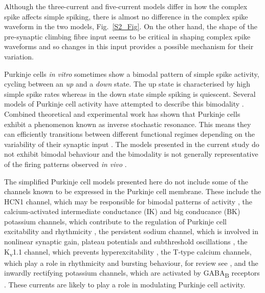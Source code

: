 \documentclass[twocolumn]{svjour3}          %
\begin{document}
Although the three-current and five-current models differ in how the
complex spike affects simple spiking, there is almost no difference in
the complex spike waveform in the two models, Fig.~\ref{S2_Fig}. On
the other hand, the shape of the pre-synaptic climbing fibre input
seems to be critical in shaping complex spike waveforms and so changes
in this input provides a possible mechanism for their variation.

Purkinje cells \textsl{in vitro} sometimes show a bimodal pattern of
simple spike activity, cycling between an \textsl{up} and a
\textsl{down} state. The up state is characterised by high simple
spike rates whereas in the down state simple spiking is
quiescent. Several models of Purkinje cell activity have attempted to
describe this bimodality
\citep{Forrest2014,ForrestEtAl2012,LlinasSugimori1980b,LoewensteinEtAl2005,McKayEtAl2007,WilliamsEtAl2002}. Combined theoretical and experimental work has shown that Purkinje cells exhibit a phenomenon known as inverse stochastic resonance. This means they can efficiently transitions between different functional regimes depending on the variability of their synaptic input \citep{buchin2016inverse}. The
models presented in the current study do not exhibit bimodal behaviour and the
bimodality is not generally representative of the firing patterns
observed \textsl{in vivo}
\citep{CerminaraRawson2004,McKayEtAl2007,SchonewilleEtAl2006}.

The simplified Purkinje cell models presented here do not include some
of the channels known to be expressed in the Purkinje cell
membrane. These include the HCN1 channel, which may be responsible for
bimodal patterns of activity \citep{LoewensteinEtAl2005}, the
calcium-activated intermediate conductance (IK) and big conducance
(BK) potassium channels, which contribute to the regulation of
Purkinje cell excitability and rhythmicity \citep{CheronEtAl2009}, the
persistent sodium channel, which is involved in nonlinear synaptic
gain, plateau potentials and subthreshold oscillations
\citep{KayEtAl1998}, the K\textsubscript{v}1.1 channel, which prevents
hyperexcitability \citep{ZhangEtAl1999}, the T-type calcium channels,
which play a role in rhythmicity and bursting behaviour, for review
see \citet{CainSnutch2010}, and the inwardly rectifying potassium
channels, which are activated by GABA\textsubscript{B} receptors
\citep{TabataEtAl2005}. These currents are likely to play a role in
modulating Purkinje cell activity.
\end{document}
